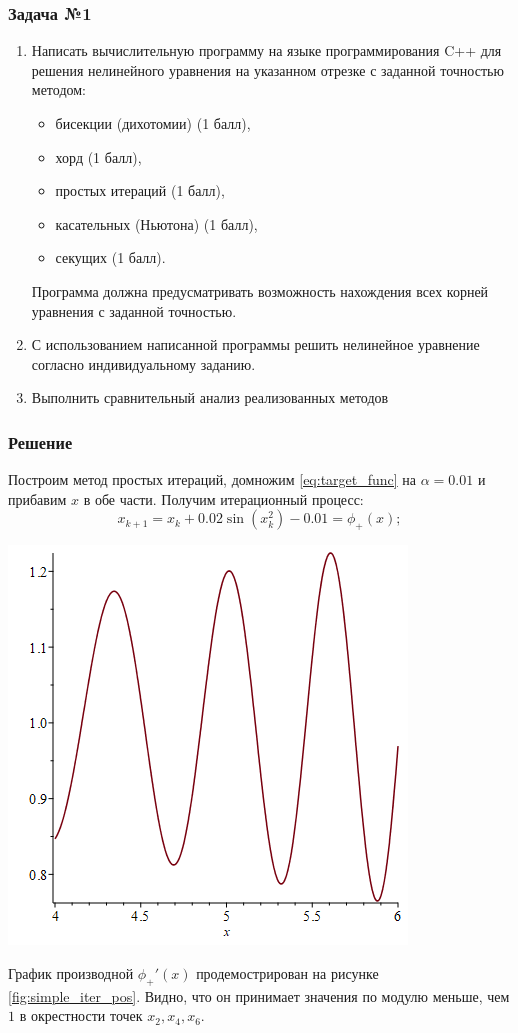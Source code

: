 \documentclass[a4paper, fontsize=14pt]{article}
\begin{document}
\subsubsection*{Задача №1}
\begin{enumerate}
\item Написать вычислительную программу на языке программирования C++ для решения нелинейного уравнения на указанном отрезке с заданной точностью методом:
\begin{itemize}
    \item бисекции (дихотомии) (1 балл),
    \item хорд (1 балл),
    \item простых итераций (1 балл),
    \item касательных (Ньютона) (1 балл),
    \item секущих (1 балл).
\end{itemize}
Программа должна предусматривать возможность нахождения всех
корней уравнения с заданной точностью.
\item С использованием написанной программы решить нелинейное уравнение
согласно индивидуальному заданию.
\item Выполнить сравнительный анализ реализованных методов
\end{enumerate}
\subsubsection*{Решение}

Построим метод простых итераций, домножим \eqref{eq:target_func} на $\alpha = 0.01$ и прибавим $x$ в обе части.
Получим итерационный процесс:
\begin{equation}
    x_{k+1} = x_{k} + 0.02 \sin(x^2_k) - 0.01 = \phi_{+}(x);
\end{equation}

\begin{center}
    \includegraphics[scale=0.6]{src/simple_iter_pos.png}
    \label{fig:simple_iter_pos}
\end{center}
График производной $\phi_{+}'(x)$ продемострирован на рисунке \ref{fig:simple_iter_pos}. Видно, что он принимает значения по модулю меньше, чем $1$ в окрестности точек $x_2, x_4, x_6$.
\end{document}
